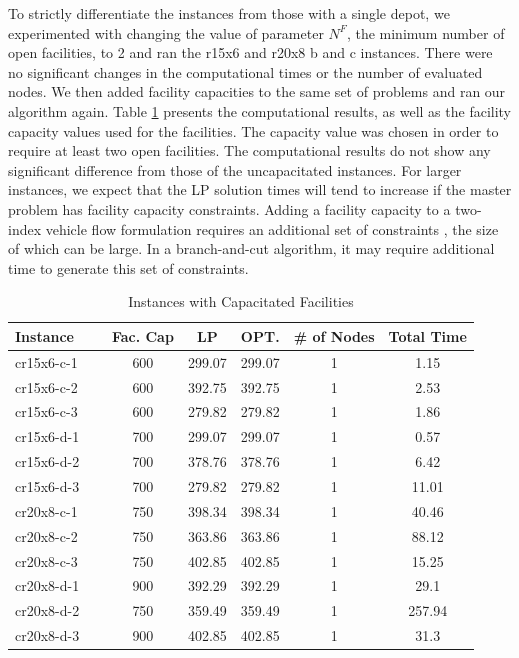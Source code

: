 \documentclass[graybox]{./styles/svmult}
\begin{document}
To strictly differentiate the instances from those with a single
depot, we experimented with changing the value of parameter $N^F$, the
minimum number of open facilities, to 2 and ran the r15x6 and r20x8 b
and c instances. There were no significant changes in the
computational times or the number of evaluated nodes. We then added
facility capacities to the same set of problems and ran our algorithm
again. Table \ref{gr4-fc} presents the computational results, as well
as the facility capacity values used for the facilities. The capacity
value was chosen in order to require at least two open facilities. The
computational results do not show any significant difference from
those of the uncapacitated instances. For larger instances, we expect
that the LP solution times will tend to increase if the master problem
has facility capacity constraints. Adding a facility capacity to a
two-index vehicle flow formulation requires an additional set of
constraints \citep{Belenguer}, the size of which can be large.
In a branch-and-cut algorithm, it may require additional time to
generate this set of constraints.
\begin{table}[ht]
\centering
\caption{Instances with Capacitated Facilities}\label{gr4-fc}
\begin {tabular}[t]{|l|c|c|c|c|c|}  
\hline
Instance & Fac. Cap & LP & OPT. & \# of Nodes & Total Time \\\hline
cr15x6-c-1 \ \	&	600	&	299.07	&	299.07	&	1	&	1.15	\\
cr15x6-c-2 \ \	&	600	&	392.75	&	392.75	&	1	&	2.53	\\
cr15x6-c-3 \ \	&	600	&	279.82	&	279.82	&	1	&	1.86	\\
cr15x6-d-1 \ \	&	700	&	299.07	&	299.07	&	1	&	0.57	\\
cr15x6-d-2 \ \	&	700	&	378.76	&	378.76	&	1	&	6.42	\\
cr15x6-d-3 \ \	&	700	&	279.82	&	279.82	&	1	&	11.01	\\
cr20x8-c-1 \ \	&	750	&	398.34	&	398.34	&	1	&	40.46	\\
cr20x8-c-2 \ \	&	750	&	363.86	&	363.86	&	1	&	88.12	\\
cr20x8-c-3 \ \	&	750	&	402.85	&	402.85	&	1	&	15.25	\\
cr20x8-d-1 \ \	&	900	&	392.29	&	392.29	&	1	&	29.1	\\
cr20x8-d-2 \ \	&	750	&	359.49	&	359.49	&	1	&	257.94	\\
cr20x8-d-3 \ \	&	900	&	402.85	&	402.85	&	1	&	31.3	\\\hline
\end{tabular}
\end{table} 
\end{document}
